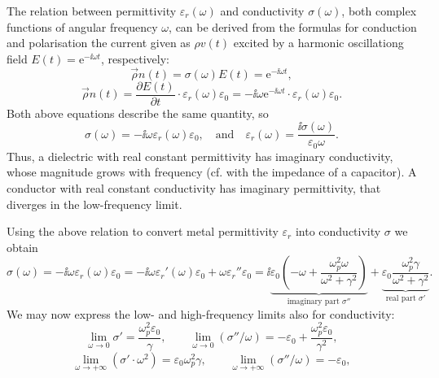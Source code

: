 \documentclass[letterpaper,12pt]{report}
\begin{document}
The relation between permittivity $\varepsilon_r(\omega)$ and conductivity $\sigma(\omega)$, both complex functions of angular frequency $\omega$, can be derived from the formulas for conduction and polarisation the current given as  $\rho v(t)$ excited by a harmonic oscillationg field $E(t) = \mathrm{e}^{-\ii\omega t}$, respectively: %
\begin{equation} \vec \rho n(t) = \sigma(\omega) E(t) = \mathrm{e}^{-\ii\omega t}, \label{eq_rho_n1}\end{equation}
\begin{equation} \vec \rho n(t) = \frac{\partial E(t)}{\partial t} \cdot \varepsilon_r(\omega) \varepsilon_0  =-\ii \omega \mathrm{e}^{-\ii\omega t} \cdot \varepsilon_r(\omega) \varepsilon_0. \label{eq_rho_n2}\end{equation}
Both above equations describe the same quantity, so
\begin{equation} \sigma(\omega) = -\ii \omega \varepsilon_r(\omega) \varepsilon_0, \quad  \text{and} \quad  \varepsilon_r(\omega)  = \frac{\ii\sigma(\omega)}{\varepsilon_0 \omega}. \label{eq_}\end{equation}
Thus, a dielectric with real constant permittivity has imaginary conductivity, whose magnitude grows with frequency (cf. with the impedance of a capacitor). A conductor with real constant conductivity has imaginary permittivity, that diverges in the low-frequency limit. 

Using the above relation to convert metal permittivity $\varepsilon_r$ into conductivity $\sigma$ we obtain
\begin{equation} \sigma(\omega) = -\ii \omega \varepsilon_r(\omega)\varepsilon_0 = -\ii\omega \varepsilon_r'(\omega) \varepsilon_0  +  \omega \varepsilon_r'' \varepsilon_0 = 
	\ii \underbrace{\varepsilon_0 \left(-\omega + \frac{\omega_p^2\omega}{\omega^2+\gamma^2}\right)}_{\text{imaginary part } \sigma''} + 
		\underbrace{\varepsilon_0\frac{\omega_p^2\gamma}{\omega^2+\gamma^2}}_{\text{real part } \sigma'}. \label{eq_}\end{equation}
We may now express the low- and high-frequency limits also for conductivity:
\begin{equation} \lim_{\omega \to 0} \sigma' = \frac{\omega_p^2\varepsilon_0}{\gamma}, \quad \quad  
				 \lim_{\omega \to 0} (\sigma'' / \omega) = -\varepsilon_0 + \frac{\omega_p^2 \varepsilon_0}{\gamma^2} , \label{eq_}\end{equation}
\begin{equation} \lim_{\omega \to +\infty} (\sigma' \cdot \omega^2) = \varepsilon_0\omega_p^2\gamma, \quad \quad  
				 \lim_{\omega \to +\infty} (\sigma'' / \omega) = -\varepsilon_0, \label{eq_}\end{equation}
\end{document}
